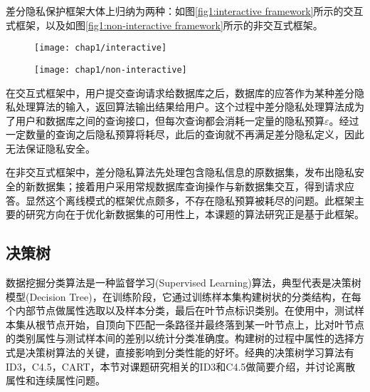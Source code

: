 差分隐私保护框架大体上归纳为两种：如图\ref{fig1:interactive framework}所示的交互式框架，以及如图\ref{fig1:non-interactive framework}所示的非交互式框架。

\begin{figure}[!htp]
	\centering
	\texttt{[image: chap1/interactive]}
\end{figure}

\begin{figure}[!htp]
	\centering
	\texttt{[image: chap1/non-interactive]}
\end{figure}

在交互式框架中，用户提交查询请求给数据库之后，数据库的应答作为某种差分隐私处理算法的输入，返回算法输出结果给用户。这个过程中差分隐私处理算法成为了用户和数据库之间的查询接口，但每次查询都会消耗一定量的隐私预算$\varepsilon$。经过一定数量的查询之后隐私预算将耗尽，此后的查询就不再满足差分隐私定义，因此无法保证隐私安全。

在非交互式框架中，差分隐私算法先处理包含隐私信息的原数据集，发布出隐私安全的新数据集；接着用户采用常规数据库查询操作与新数据集交互，得到请求应答。显然这个离线模式的框架优点颇多，不存在隐私预算被耗尽的问题。此框架主要的研究方向在于优化新数据集的可用性上，本课题的算法研究正是基于此框架。


\subsection{决策树} %
\label{chap1_decisicon_tree}
数据挖掘分类算法是一种监督学习(Supervised Learning)算法，典型代表是决策树模型(Decision Tree)\supercite{decision tree}，在训练阶段，它通过训练样本集构建树状的分类结构，在每个内部节点做属性选取以及样本分类，最后在叶节点标识类别。在使用中，测试样本集从根节点开始，自顶向下匹配一条路径并最终落到某一叶节点上，比对叶节点的类别属性与测试样本间的差别以统计分类准确度。构建树的过程中属性的选择方式是决策树算法的关键，直接影响到分类性能的好坏。经典的决策树学习算法有ID3\supercite{decision-tree}，C4.5\supercite{c45}，CART\supercite{cart}，本节对课题研究相关的ID3和C4.5做简要介绍，并讨论离散属性和连续属性问题。

